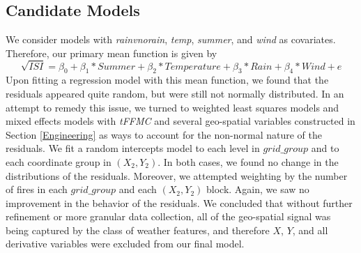 \documentclass{article}
\begin{document}
\subsection{Candidate Models}\label{candidate}
We consider models with \textit{rainvnorain}, \textit{temp}, \textit{summer}, and \textit{wind} as covariates.
Therefore, our primary mean function is given by 
\begin{equation}\label{mean_func}
\sqrt{ISI} = \beta_0 + \beta_1*Summer + \beta_2*Temperature + \beta_3*Rain + \beta_4 *Wind + e
\end{equation}
Upon fitting a regression model with this mean function, we found that the residuals appeared quite random, but were still not normally distributed. In an attempt to remedy this issue, we turned to weighted least squares models and mixed effects models with \textit{tFFMC} and several geo-spatial variables constructed in Section \ref{Engineering} as ways to account for the non-normal nature of the residuals.  
We fit a random intercepts model to each level in $grid\_group$ and to each coordinate group in $(X_2, Y_2)$. In both cases, we found no change in the distributions of the residuals. Moreover, we attempted weighting by the number of fires in each $grid\_group$ and each $(X_2, Y_2)$ block. Again, we saw no improvement in the behavior of the residuals.  We concluded that without further refinement or more granular data collection, all of the geo-spatial signal was being captured by the class of weather features, and therefore $X$, $Y$, and all derivative variables were excluded from our final model. 
\end{document}
